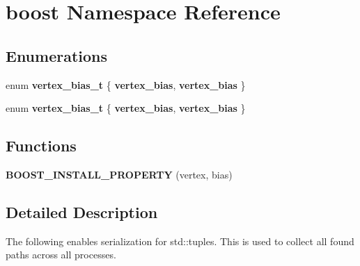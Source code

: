 \hypertarget{a00426}{}\section{boost Namespace Reference}
\label{a00426}
\subsection*{Enumerations}
\begin{DoxyCompactItemize}
\item 
enum {\bfseries vertex\+\_\+bias\+\_\+t} \{ {\bfseries vertex\+\_\+bias}, 
{\bfseries vertex\+\_\+bias}
 \}\hypertarget{a00426_a3af0d3b7e3e0361d4eaa8c0d80064236}{}\label{a00426_a3af0d3b7e3e0361d4eaa8c0d80064236}

\item 
enum {\bfseries vertex\+\_\+bias\+\_\+t} \{ {\bfseries vertex\+\_\+bias}, 
{\bfseries vertex\+\_\+bias}
 \}\hypertarget{a00426_a3af0d3b7e3e0361d4eaa8c0d80064236}{}\label{a00426_a3af0d3b7e3e0361d4eaa8c0d80064236}

\end{DoxyCompactItemize}
\subsection*{Functions}
\begin{DoxyCompactItemize}
\item 
{\bfseries B\+O\+O\+S\+T\+\_\+\+I\+N\+S\+T\+A\+L\+L\+\_\+\+P\+R\+O\+P\+E\+R\+TY} (vertex, bias)\hypertarget{a00426_afde239da9a8a39f1a1d03b0a11e25965}{}\label{a00426_afde239da9a8a39f1a1d03b0a11e25965}

\end{DoxyCompactItemize}


\subsection{Detailed Description}
The following enables serialization for std\+::tuples. This is used to collect all found paths across all processes. 